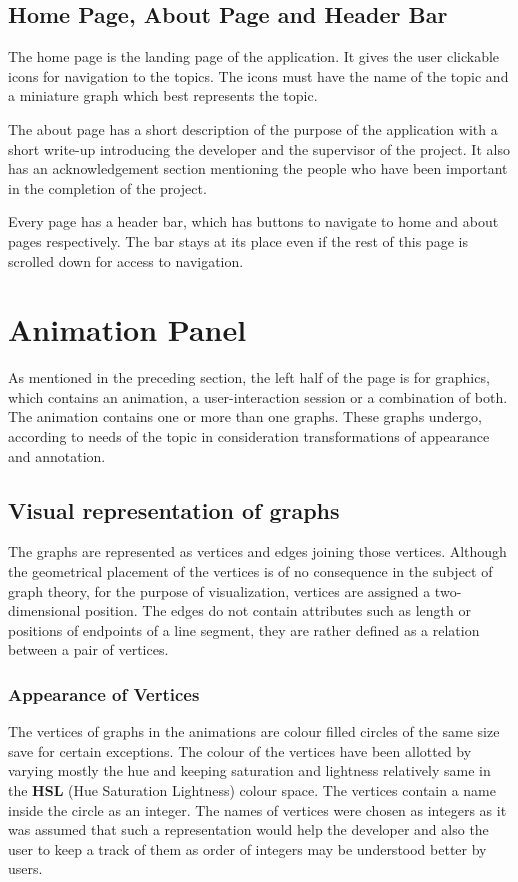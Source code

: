 \subsection{Home Page, About Page and Header Bar}
\label{design: home}

The home page is the landing page of the application. It gives the user
clickable icons for navigation to the topics. The icons must have the name of
the topic and a miniature graph which best represents the topic. 

The about page has a short description of the purpose of the application with a
short write-up introducing the developer and the supervisor of the project. It
also has an acknowledgement section mentioning the people who have been important
in the completion of the project.

Every page has a header bar, which has buttons to navigate to home and about
pages respectively. The bar stays at its place even if the rest of this
page is scrolled down for access to navigation.

\section{Animation Panel} 
As mentioned in the preceding section, the left half of the page is for
graphics, which contains an animation, a user-interaction session or a
combination of both.  The animation contains one or more than one graphs. These
graphs undergo, according to needs of the topic in consideration
transformations of appearance and annotation.

\subsection{Visual representation of graphs} 
The graphs are represented as vertices and edges joining those vertices.
Although the geometrical placement of the vertices is of no consequence in the
subject of graph theory, for the purpose of visualization, vertices are
assigned a two-dimensional position. The edges do not contain attributes such as
length or positions of endpoints of a line segment, they are rather defined as
a relation between a pair of vertices.

\subsubsection{Appearance of Vertices} 

The vertices of graphs in the animations are colour filled circles of the
same size save for certain exceptions. The colour of the vertices have been
allotted by varying mostly the hue and keeping saturation and lightness
relatively same in the \textbf{HSL} (Hue Saturation Lightness) colour space. The
vertices contain a name inside the circle as an integer. The names of vertices
were chosen as integers as it was assumed that such a representation would help
the developer and also the user to keep a track of them as order of integers
may be understood better by users.

